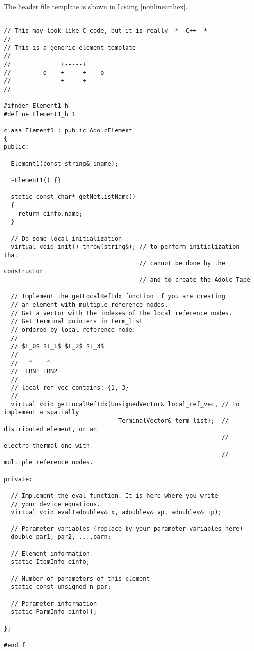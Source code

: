 The header file template is shown in Listing \ref{nonlinear:hex}.

\begin{lstlisting}[firstnumber=1, label={nonlinear:hex},
    caption={Element1.h}]

// This may look like C code, but it is really -*- C++ -*-
//
// This is a generic element template
//
//              +-----+
//         o----+     +----o
//              +-----+
//

#ifndef Element1_h
#define Element1_h 1

class Element1 : public AdolcElement
{
public:

  Element1(const string& iname);

  ~Element1() {}

  static const char* getNetlistName()
  {
    return einfo.name;
  }

  // Do some local initialization
  virtual void init() throw(string&); // to perform initialization that
                                      // cannot be done by the constructor
                                      // and to create the Adolc Tape

  // Implement the getLocalRefIdx function if you are creating
  // an element with multiple reference nodes.
  // Get a vector with the indexes of the local reference nodes.
  // Get terminal pointers in term_list
  // ordered by local reference node:
  //
  // $t_0$ $t_1$ $t_2$ $t_3$
  //
  //   ^    ^
  //  LRN1 LRN2
  //
  // local_ref_vec contains: {1, 3}
  //
  virtual void getLocalRefIdx(UnsignedVector& local_ref_vec, // to implement a spatially
                                TerminalVector& term_list);  // distributed element, or an
                                                             // electro-thermal one with
                                                             // multiple reference nodes.

private:

  // Implement the eval function. It is here where you write
  // your device equations.
  virtual void eval(adoublev& x, adoublev& vp, adoublev& ip);

  // Parameter variables (replace by your parameter variables here)
  double par1, par2, ...,parn;

  // Element information
  static ItemInfo einfo;

  // Number of parameters of this element
  static const unsigned n_par;

  // Parameter information
  static ParmInfo pinfo[];

};

#endif
\end{lstlisting}


